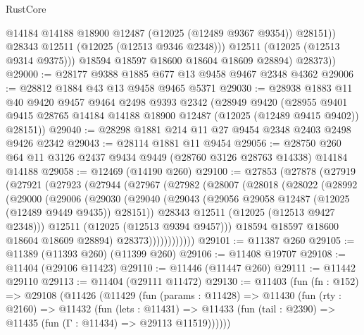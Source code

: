 \begin{lexlean}{RustCore}
\begin{coremodule}
                  @14184
                  @14188
                  @18900
                  @12487
                  (@12025 (@12489 @9367 @9354))
                  @28151))
              @28343
              @12511
              (@12025 (@12513 @9346 @2348)))
            @12511
            (@12025 (@12513 @9314 @9375)))
          @18594
          @18597
          @18600
          @18604
          @18609
          @28894)
        @28373))
@29000 := @28177 @9388 @1885 @677 @13 @9458 @9467 @2348 @4362
@29006 := @28812 @1884 @43 @13 @9458 @9465 @5371
@29030 := @28938
    @1883
    @11
    @40
    @9420
    @9457
    @9464
    @2498
    @9393
    @2342
    (@28949
      @9420
      (@28955 @9401 @9415 @28765 @14184 @14188 @18900 @12487 (@12025 (@12489 @9415 @9402)) @28151))
@29040 := @28298 @1881 @214 @11 @27 @9454 @2348 @2403 @2498 @9426 @2342
@29043 := @28114 @1881 @11 @9454
@29056 := @28750 @260 @64 @11 @3126 @2437 @9434 @9449 (@28760 @3126 @28763 @14338) @14184 @14188
@29058 := @12469 (@14190 @260)
@29100 := @27853
    (@27878
      (@27919
        (@27921
          (@27923
            (@27944
              (@27967
                (@27982
                  (@28007
                    (@28018
                      (@28022
                        (@28992
                          (@29000
                            (@29006
                              (@29030
                                (@29040
                                  (@29043
                                    (@29056 @29058 @12487 (@12025 (@12489 @9449 @9435)) @28151))
                                  @28343
                                  @12511
                                  (@12025 (@12513 @9427 @2348)))
                                @12511
                                (@12025 (@12513 @9394 @9457)))
                              @18594
                              @18597
                              @18600
                              @18604
                              @18609
                              @28894)
                            @28373))))))))))))
@29101 := @11387 @260
@29105 := @11389 (@11393 @260) (@11399 @260)
@29106 := @11408 @19707
@29108 := @11404 (@29106 @11423)
@29110 := @11446 (@11447 @260)
@29111 := @11442 @29110
@29113 := @11404 (@29111 @11472)
@29130 := @11403
    (fun (fn : @152) =>
    @29108
      (@11426
        (@11429
          (fun (params : @11428) =>
          @11430
            (fun (rty : @2160) =>
            @11432
              (fun (lets : @11431) =>
              @11433 (fun (tail : @2390) => @11435 (fun (Γ : @11434) => @29113 @11519))))))

\end{coremodule}
\end{lexlean}
